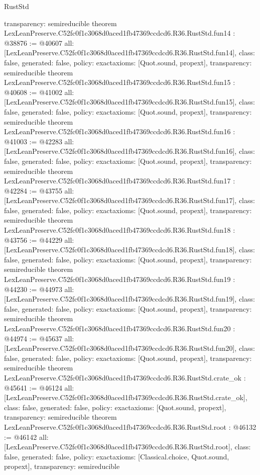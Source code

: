 \begin{lexlean}{RustStd}
\begin{coremodule}
{  transparency: semireducible
}
theorem LexLeanPreserve.C52fc0f1c3068d0aced1fb47369ccdcd6.R36.RustStd.fun14 : @38876 := @40607 {
  all: [LexLeanPreserve.C52fc0f1c3068d0aced1fb47369ccdcd6.R36.RustStd.fun14],
  class: false,
  generated: false,
  policy: exact{axioms: [Quot.sound, propext]},
  transparency: semireducible
}
theorem LexLeanPreserve.C52fc0f1c3068d0aced1fb47369ccdcd6.R36.RustStd.fun15 : @40608 := @41002 {
  all: [LexLeanPreserve.C52fc0f1c3068d0aced1fb47369ccdcd6.R36.RustStd.fun15],
  class: false,
  generated: false,
  policy: exact{axioms: [Quot.sound, propext]},
  transparency: semireducible
}
theorem LexLeanPreserve.C52fc0f1c3068d0aced1fb47369ccdcd6.R36.RustStd.fun16 : @41003 := @42283 {
  all: [LexLeanPreserve.C52fc0f1c3068d0aced1fb47369ccdcd6.R36.RustStd.fun16],
  class: false,
  generated: false,
  policy: exact{axioms: [Quot.sound, propext]},
  transparency: semireducible
}
theorem LexLeanPreserve.C52fc0f1c3068d0aced1fb47369ccdcd6.R36.RustStd.fun17 : @42284 := @43755 {
  all: [LexLeanPreserve.C52fc0f1c3068d0aced1fb47369ccdcd6.R36.RustStd.fun17],
  class: false,
  generated: false,
  policy: exact{axioms: [Quot.sound, propext]},
  transparency: semireducible
}
theorem LexLeanPreserve.C52fc0f1c3068d0aced1fb47369ccdcd6.R36.RustStd.fun18 : @43756 := @44229 {
  all: [LexLeanPreserve.C52fc0f1c3068d0aced1fb47369ccdcd6.R36.RustStd.fun18],
  class: false,
  generated: false,
  policy: exact{axioms: [Quot.sound, propext]},
  transparency: semireducible
}
theorem LexLeanPreserve.C52fc0f1c3068d0aced1fb47369ccdcd6.R36.RustStd.fun19 : @44230 := @44973 {
  all: [LexLeanPreserve.C52fc0f1c3068d0aced1fb47369ccdcd6.R36.RustStd.fun19],
  class: false,
  generated: false,
  policy: exact{axioms: [Quot.sound, propext]},
  transparency: semireducible
}
theorem LexLeanPreserve.C52fc0f1c3068d0aced1fb47369ccdcd6.R36.RustStd.fun20 : @44974 := @45637 {
  all: [LexLeanPreserve.C52fc0f1c3068d0aced1fb47369ccdcd6.R36.RustStd.fun20],
  class: false,
  generated: false,
  policy: exact{axioms: [Quot.sound, propext]},
  transparency: semireducible
}
theorem LexLeanPreserve.C52fc0f1c3068d0aced1fb47369ccdcd6.R36.RustStd.crate_ok : @45641 := @46124 {
  all: [LexLeanPreserve.C52fc0f1c3068d0aced1fb47369ccdcd6.R36.RustStd.crate_ok],
  class: false,
  generated: false,
  policy: exact{axioms: [Quot.sound, propext]},
  transparency: semireducible
}
theorem LexLeanPreserve.C52fc0f1c3068d0aced1fb47369ccdcd6.R36.RustStd.root : @46132 := @46142 {
  all: [LexLeanPreserve.C52fc0f1c3068d0aced1fb47369ccdcd6.R36.RustStd.root],
  class: false,
  generated: false,
  policy: exact{axioms: [Classical.choice, Quot.sound, propext]},
  transparency: semireducible
}


\end{coremodule}
\end{lexlean}
